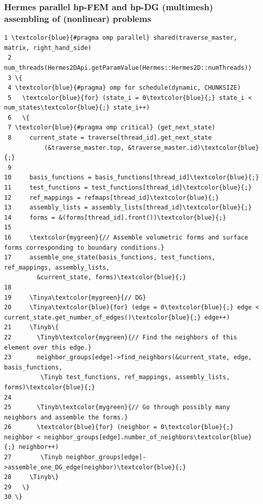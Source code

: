 \documentclass{beamer}
\begin{document}
\begin{frame}[fragile]
\frametitle{Hermes parallel hp-FEM and hp-DG (multimesh) assembling of (nonlinear) problems}
\begin{Verbatim}[commandchars=\\\{\}, fontsize=\Tiny]
 1 \textcolor{blue}{#pragma omp parallel} shared(traverse_master, matrix, right_hand_side)
 2 num_threads(Hermes2DApi.getParamValue(Hermes::Hermes2D::numThreads))
 3 \{
 4 \textcolor{blue}{#pragma} omp for schedule(dynamic, CHUNKSIZE)
 5   \textcolor{blue}{for} (state_i = 0\textcolor{blue}{;} state_i < num_states\textcolor{blue}{;} state_i++)
 6   \{
 7 \textcolor{blue}{#pragma omp critical} (get_next_state)
 8     current_state = traverse[thread_id].get_next_state
           (&traverse_master.top, &traverse_master.id)\textcolor{blue}{;}
 9
10     basis_functions = basis_functions[thread_id]\textcolor{blue}{;}
11     test_functions = test_functions[thread_id]\textcolor{blue}{;}
12     ref_mappings = refmaps[thread_id]\textcolor{blue}{;}
13     assembly_lists = assembly_lists[thread_id]\textcolor{blue}{;}
14     forms = &(forms[thread_id].front())\textcolor{blue}{;}
15 
16     \textcolor{mygreen}{// Assemble volumetric forms and surface forms corresponding to boundary conditions.}
17     assemble_one_state(basis_functions, test_functions, ref_mappings, assembly_lists,
         &current_state, forms)\textcolor{blue}{;}
18 
19     \Tinya\textcolor{mygreen}{// DG}
20     \Tinya\textcolor{blue}{for} (edge = 0\textcolor{blue}{;} edge < current_state.get_number_of_edges()\textcolor{blue}{;} edge++)
21     \Tinyb\{
22       \Tinyb\textcolor{mygreen}{// Find the neighbors of this element over this edge.}
23       neighbor_groups[edge]->find_neighbors(&current_state, edge, basis_functions, 
          \Tinyb test_functions, ref_mappings, assembly_lists, forms)\textcolor{blue}{;}
24       
25       \Tinyb\textcolor{mygreen}{// Go through possibly many neighbors and assemble the forms.}
26       \textcolor{blue}{for} (neighbor = 0\textcolor{blue}{;} neighbor < neighbor_groups[edge].number_of_neighbors\textcolor{blue}{;} neighbor++)
27        \Tinyb neighbor_groups[edge]->assemble_one_DG_edge(neighbor)\textcolor{blue}{;}
28     \Tinyb\}
29   \}
30 \}
\end{Verbatim}
\end{frame}
\end{document}
